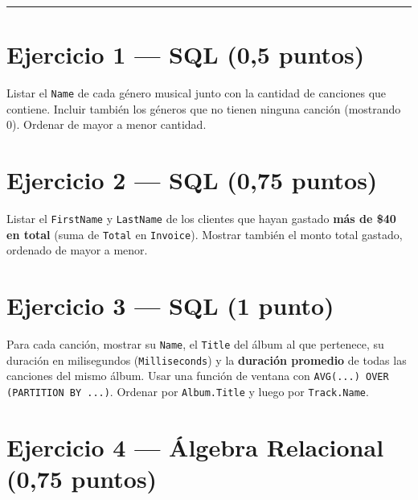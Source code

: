 \documentclass[11pt,a4paper]{article}
\begin{document}
\vspace{4pt}
\noindent\rule{\linewidth}{0.4pt}

\section*{Ejercicio 1 — SQL \hfill\normalfont(0{,}5 puntos)}

Listar el \texttt{Name} de cada género musical junto con la cantidad de canciones que contiene. Incluir también los géneros que no tienen ninguna canción (mostrando 0). Ordenar de mayor a menor cantidad.

\vspace{8pt}

\section*{Ejercicio 2 — SQL \hfill\normalfont(0{,}75 puntos)}

Listar el \texttt{FirstName} y \texttt{LastName} de los clientes que hayan gastado \textbf{más de \$40 en total} (suma de \texttt{Total} en \texttt{Invoice}). Mostrar también el monto total gastado, ordenado de mayor a menor.

\vspace{8pt}

\section*{Ejercicio 3 — SQL \hfill\normalfont(1 punto)}

Para cada canción, mostrar su \texttt{Name}, el \texttt{Title} del álbum al que pertenece, su duración en milisegundos (\texttt{Milliseconds}) y la \textbf{duración promedio} de todas las canciones del mismo álbum. Usar una función de ventana con \texttt{AVG(...) OVER (PARTITION BY ...)}. Ordenar por \texttt{Album.Title} y luego por \texttt{Track.Name}.

\vspace{8pt}

\section*{Ejercicio 4 — Álgebra Relacional \hfill\normalfont(0{,}75 puntos)}
\end{document}
